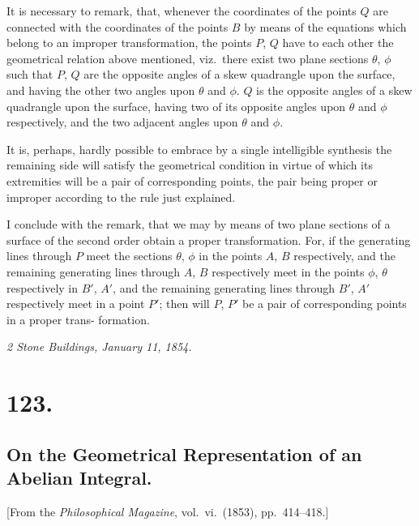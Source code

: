 \documentclass[11pt,a4paper]{article}
\theoremstyle{definition}
\begin{document}
\medskip

It is necessary to remark, that, whenever the coordinates of the points $Q$ are
connected with the coordinates of the points $B$ by means of the equations which
belong to an improper transformation, the points $P$, $Q$ have to each other the
geometrical relation above mentioned, viz.\ there exist two plane sections $\theta$, $\phi$ such
that $P$, $Q$ are the opposite angles of a skew quadrangle upon the surface, and having
the other two angles upon $\theta$ and $\phi$. $Q$ is the opposite angles of a skew quadrangle
upon the surface, having two of its opposite angles upon $\theta$ and $\phi$ respectively, and the
two adjacent angles upon $\theta$ and $\phi$.

\medskip

It is, perhaps, hardly possible to embrace by a single intelligible synthesis the
remaining side will satisfy the geometrical condition in virtue of which its extremities
will be a pair of corresponding points, the pair being proper or improper according
to the rule just explained.

\medskip

I conclude with the remark, that we may by means of two plane sections of a
surface of the second order obtain a proper transformation. For, if the generating
lines through $P$ meet the sections $\theta$, $\phi$ in the points $A$, $B$ respectively, and the
remaining generating lines through $A$, $B$ respectively meet in the points $\phi$, $\theta$ respectively
in $B'$, $A'$, and the remaining generating lines through $B'$, $A'$ respectively meet
in a point $P'$; then will $P$, $P'$ be a pair of corresponding points in a proper trans-
formation.

\medskip
\noindent\textit{2 Stone Buildings, January 11, 1854.}

\section*{123.}
\subsection*{On the Geometrical Representation of an Abelian Integral.}

[From the \textit{Philosophical Magazine}, vol.\ vi.\ (1853), pp.\ 414--418.]
\end{document}
